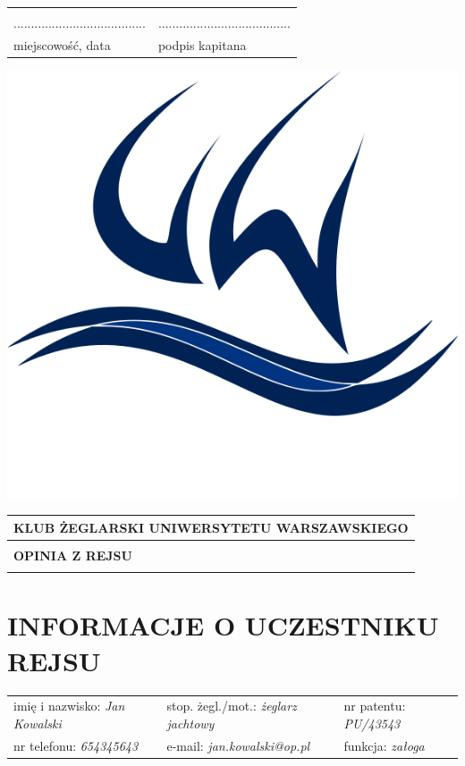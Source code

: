 \documentclass{article}
\begin{document}
\begin{tabularx}{\textwidth}{X X}
\\\\
...................................... & ......................................\\
miejscowość, data & podpis kapitana\\
\end{tabularx}
\newpage
\begin{minipage}{0.11\textwidth}
\includegraphics[width=\textwidth]{logo.png}
\end{minipage}
\begin{minipage}{0.89\textwidth}
\begin{tabularx}{\textwidth} { 
  | >{\centering\arraybackslash}X | }
 \hline
 \textbf{KLUB ŻEGLARSKI UNIWERSYTETU WARSZAWSKIEGO} \\
 \hline
 \\
 \textbf{\huge OPINIA Z REJSU} \\
 \\
\hline
\end{tabularx}
\end{minipage}

\section*{INFORMACJE O UCZESTNIKU REJSU}
\begin{tabularx}{\textwidth}{X X X}
imię i nazwisko: \textit{Jan Kowalski} & stop. żegl./mot.: \textit{żeglarz jachtowy} & nr patentu: \textit{PU/43543} \\
nr telefonu: \textit{654345643} & e-mail: \textit{jan.kowalski@op.pl} & funkcja: \textit{załoga} \\
\end{tabularx}
\end{document}
